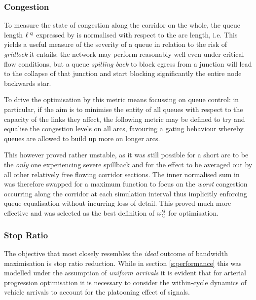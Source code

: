\subsubsection{Congestion}
To measure the state of congestion along the corridor on the whole, the queue length $\ell_{}^{\scriptscriptstyle{\:Q}}$ expressed by  is normalised with respect to the arc length, i.e.
This yields a useful measure of the severity of a queue in relation to the risk of \emph{gridlock} it entails: the network may perform reasonably well even under critical flow conditions, but a queue \emph{spilling back} to block egress from a junction will lead to the collapse of that junction and start blocking significantly the entire node backwards star.

To drive the optimisation by this metric means focussing on queue control: in particular, if the aim is to minimise the entity of all queues with respect to the capacity of the links they affect, the following metric may be defined
to try and equalise the congestion levels on all arcs, favouring a gating behaviour whereby queues are allowed to build up more on longer arcs.

This however proved rather unstable, as it was still possible for a short arc to be the \emph{only} one experiencing severe spillback and for the effect to be averaged out by all other relatively free flowing corridor sections. The inner normalised sum in  was therefore swapped for a maximum function to focus on the \emph{worst} congestion occurring along the corridor at each simulation interval
thus implicitly enforcing queue equalisation without incurring loss of detail. This proved much more effective and was selected as the best definition of $\omega_{\mathrm{C}}^{\scriptscriptstyle{Q}}$ for optimisation.

\subsubsection{Stop Ratio}
The objective that most closely resembles the \emph{ideal} outcome of bandwidth maximisation is stop ratio reduction. While in section \ref{s:performance} this was modelled under the assumption of \emph{uniform arrivals} it is evident that for arterial progression optimisation it is necessary to consider the within-cycle dynamics of vehicle arrivals to account for the platooning effect of signals.

